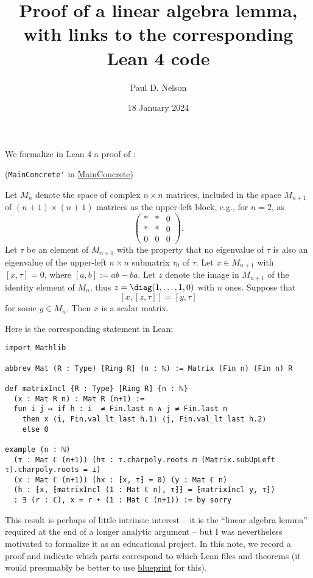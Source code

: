 \documentclass[reqno]{amsart} 
\title{Proof of a linear algebra lemma, with links to the corresponding Lean 4 code}
\author{Paul D. Nelson}
\date{18 January 2024}
\begin{document}
\maketitle

We formalize in Lean 4 a proof of \cite[Theorem 1.8]{2020arXiv201202187N}:

\begin{theorem}\label{theorem:cnee1j2i90}
  (\verb|MainConcrete'| in \href{MainConcrete.lean}{MainConcrete})

  Let $M_{n}$ denote the space of complex $n \times n$ matrices, included in the space $M_{n+1}$ of $(n+1) \times (n+1)$ matrices as the upper-left block, e.g., for $n = 2$, as
  \[
    \begin{pmatrix}
      \ast & \ast & 0 \\
      \ast & \ast & 0 \\
      0 & 0 & 0
    \end{pmatrix}.
  \]
  Let $\tau$ be an element of $M_{n+1}$ with the property that no eigenvalue of $\tau$ is also an eigenvalue of the upper-left $n \times n$ submatrix $\tau_0$ of $\tau$.  Let $x \in M_{n+1}$ with $[x,\tau] = 0$, where $[a,b] := a b -b a$.  Let $z$ denote the image in $M_{n+1}$ of the identity element of $M_n$, thus $z = \diag(1,\dotsc,1,0)$ with $n$ ones.  Suppose that
  \[
    [x,[z,\tau]] = [y, \tau]
  \]
  for some $y \in M_n$.  Then $x$ is a scalar matrix.
\end{theorem}
Here is the corresponding statement in Lean:
\begin{verbatim}
import Mathlib

abbrev Mat (R : Type) [Ring R] (n : ℕ) := Matrix (Fin n) (Fin n) R

def matrixIncl {R : Type} [Ring R] {n : ℕ}
  (x : Mat R n) : Mat R (n+1) := 
  fun i j ↦ if h : i  ≠ Fin.last n ∧ j ≠ Fin.last n
    then x ⟨i, Fin.val_lt_last h.1⟩ ⟨j, Fin.val_lt_last h.2⟩
    else 0

example (n : ℕ)
  (τ : Mat ℂ (n+1)) (hτ : τ.charpoly.roots ⊓ (Matrix.subUpLeft τ).charpoly.roots = ⊥)
  (x : Mat ℂ (n+1)) (hx : ⁅x, τ⁆ = 0) (y : Mat ℂ n)
  (h : ⁅x, ⁅matrixIncl (1 : Mat ℂ n), τ⁆⁆ = ⁅matrixIncl y, τ⁆)
  : ∃ (r : ℂ), x = r • (1 : Mat ℂ (n+1)) := by sorry
\end{verbatim}

This result is perhaps of little intrinsic interest -- it is the ``linear algebra lemma'' required at the end of a longer analytic argument -- but I was nevertheless motivated to formalize it as an educational project.  In this note, we record a proof and indicate which parts correspond to which Lean files and theorems (it would presumably be better to use \href{https://github.com/PatrickMassot/leanblueprint}{blueprint} for this).
\end{document}

